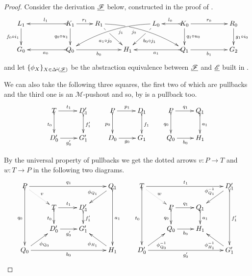 \begin{proof}
	Consider the derivation $\underline{\mathscr{F}}$ below, constructed in the proof of . 
	\[\xymatrix{L_1 \ar[d]_{f_0 \circ i_1}&& K_1
		\ar[d]_{q_0\circ u_1}\ar@{>->}[ll]_{l_1} \ar[r]^{r_1} & R_1
		\ar@/^.35cm/[drrr]|(.31)\hole_(.4){j_0} \ar[dr]|(.3)\hole_{a_1\circ
			j_0} && L_0 \ar@/_.35cm/[dlll]^(.4){j_1} \ar[dl]|(.3)\hole^{b_0\circ
			j_1}& K_0\ar[d]^{q_1\circ u_0}\ar@{>->}[l]_{l_0} \ar[rr]^{r_0} && R_0
		\ar[d]^{g_1\circ i_0} \\G_0 && \ar@{>->}[ll]^{a_0} Q_0 \ar[rr]_{b_0}&&
		H_1 && \ar@{>->}[ll]^{a_1} Q_1 \ar[rr]_{b_1}&& G_2}\]
	and let $\{\phi_{X}\}_{X\in \Delta^{\hspace{-1pt}\downarrow\hspace{-1pt}}(\underline{\mathscr{F}})}$ be the abstraction equivalence between $\underline{\mathscr{F}}$ and $\underline{\mathscr{E}}$ built in .
	
	We can also take the following three squares, the first two of which are pullbacks and the third one is an $\mathcal{M}$-pushout and so, by  is a pullback too.
	\[\xymatrix{T \ar[r]^{t_1} \ar@{>->}[d]_{t_0} & D'_1 \ar@{>->}[d]^{f'_1} & P \ar[r]^{p_1} \ar@{>->}[d]_{p_0} & D_1 \ar@{>->}[d]^{f_1} &P \ar[r]^{q_1} \ar@{>->}[d]_{q_0} & Q_1 \ar@{>->}[d]^{a_1}\\ D'_0 \ar[r]_{g'_0}& G'_1 &D_0 \ar[r]_{g_0} & G_1&Q_0 \ar[r]_{b_0} & H_1}\]
	
	 By the universal property of pullbacks  we get the dotted arrows $v\colon P\to T$ and $w\colon T\to P$ in the following two diagrams.
	\[\xymatrix@R=15pt{ P \ar@{.>}[dr]^{v} \ar[rrr]^{q_1} \ar@{>->}[ddd]_{q_0}&&& Q_1 \ar@{>->}[ddd]^{a_1} \ar[dl]_{\phi_{Q_1}}& T\ar@{.>}[dr]^{w}  \ar[rrr]^{t_1} \ar@{>->}[ddd]_{t_0}&&& D'_1 \ar[dl]_{\phi^{-1}_{Q_1}} \ar@{>->}[ddd]^{f'_1}\\&T \ar@{>->}[d]_{t_0}\ar[r]^{t_1}& D'_1 \ar@{>->}[d]^{f'_1} &&& P \ar@{>->}[d]_{q_0}\ar[r]^{q_1}& Q_1\ar@{>->}[d]^{a_1}\\ & D'_0\ar[r]_{g'_0} & G'_1 &&& Q_0 \ar[r]_{b_0}& H_1 \\Q_0 \ar[rrr]_{b_0} \ar[ur]_{\phi_{Q_0}}&&& H_1 \ar[ul]^{\phi_{H_1}} & D'_0 \ar[rrr]_{g'_0} \ar[ur]_{\phi^{-1}_{Q_0}}&&&G'_1 \ar[ul]^{\phi^{-1}_{H_1}}}\]
	

\end{proof}
